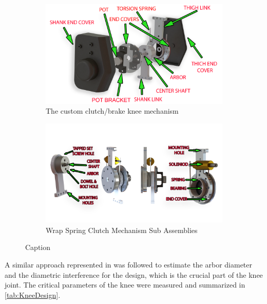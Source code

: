\begin{figure}
    \begin{subfigure}{\textwidth}
        \centering
        \captionsetup{justification=centering}
        \centerline{
        \includegraphics[scale=0.16]{images/mech_design/knee exploded view_edit2.png}}
        \caption[Custom Knee Mechanism]{The custom clutch/brake knee mechanism}
        \label{fig:kneemechASM}
    \end{subfigure}
    \begin{subfigure}{\textwidth}
        \centering
        \captionsetup{justification=centering}
        \centerline{
        \includegraphics[scale=0.3]{images/mech_design/all_knee.png}}
        \caption[Wrap Spring Clutch Mechanism]{Wrap Spring Clutch Mechanism Sub Assemblies}
        \label{fig:subknee}
    \end{subfigure}    
    \caption{Caption}
    \label{fig:kneemech}
\end{figure}

A similar approach represented in \cite{tung2013design} was followed to estimate the arbor diameter and the diametric interference for the design, which is the crucial part of the knee joint. The critical parameters of the knee were measured and summarized in \autoref{tab:KneeDesign}.

